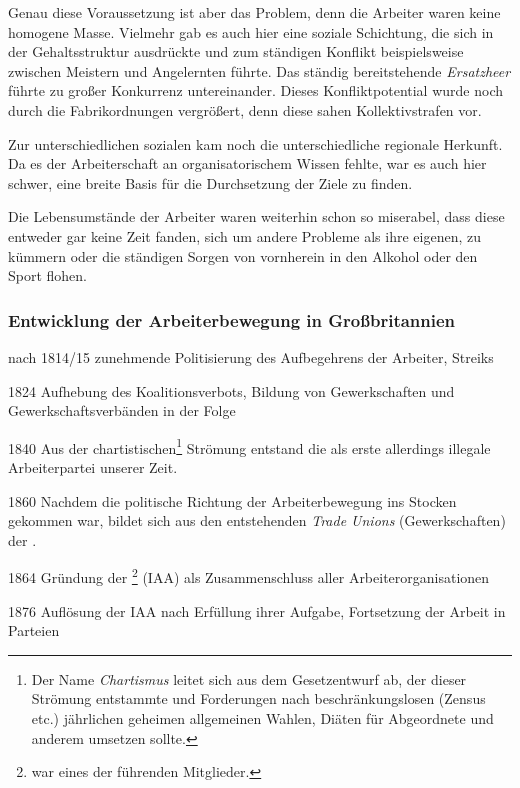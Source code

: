 Genau diese Voraussetzung ist aber das Problem, denn die Arbeiter
waren keine homogene Masse. Vielmehr gab es auch hier eine soziale
Schichtung, die sich in der Gehaltsstruktur ausdrückte und zum
ständigen Konflikt beispielsweise zwischen Meistern und
\glq{}Angelernten\grq{} führte. Das ständig bereitstehende
\emph{Ersatzheer} führte zu großer Konkurrenz untereinander. Dieses
Konfliktpotential wurde noch durch die Fabrikordnungen vergrößert,
denn diese sahen Kollektivstrafen vor.

Zur unterschiedlichen sozialen kam noch die unterschiedliche regionale
Herkunft. Da es der Arbeiterschaft an organisatorischem Wissen fehlte,
war es auch hier schwer, eine breite Basis für die Durchsetzung der
Ziele zu finden.

Die Lebensumstände der Arbeiter waren weiterhin schon so miserabel,
dass diese entweder gar keine Zeit fanden, sich um andere Probleme als
ihre eigenen, zu kümmern oder die ständigen Sorgen von vornherein in den
Alkohol oder den Sport flohen.\\


\subsubsection{Entwicklung der Arbeiterbewegung in Großbritannien}

\begin{chronik}
\item[nach 1814/15] zunehmende Politisierung des Aufbegehrens der
Arbeiter, Streiks

\item[1824] Aufhebung des Koalitionsverbots, Bildung von
Gewerkschaften und Gewerkschaftsverbänden in der Folge

\item[1840] Aus der chartistischen\footnote{Der Name \emph{Chartismus}
leitet sich aus dem Gesetzentwurf ab, der dieser Strömung entstammte
und Forderungen nach beschränkungslosen (Zensus etc.) jährlichen
geheimen allgemeinen Wahlen, Diäten für Abgeordnete und anderem
umsetzen sollte.} Strömung entstand die  als erste allerdings illegale Arbeiterpartei unserer Zeit.

\item[1860] Nachdem die politische Richtung der Arbeiterbewegung ins
Stocken gekommen war, bildet sich aus den entstehenden \emph{Trade
Unions} (Gewerkschaften) der .

\item[1864] Gründung der \footnote{ war
eines der führenden Mitglieder.} (IAA) als Zusammenschluss aller
Arbeiterorganisationen

\item[1876] Auflösung der IAA nach Erfüllung ihrer Aufgabe,
Fortsetzung der Arbeit in Parteien
\end{chronik}



